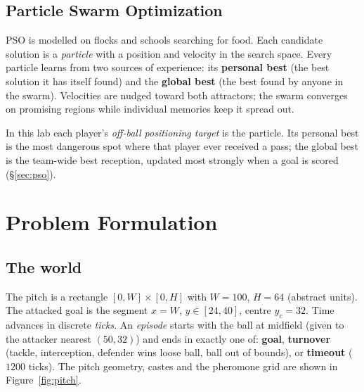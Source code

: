 \documentclass[11pt,a4paper]{article}
\begin{document}
\subsection{Particle Swarm Optimization}

PSO is modelled on flocks and schools searching for food. Each candidate solution is a
\emph{particle} with a position and velocity in the search space. Every particle learns from two
sources of experience: its \textbf{personal best} (the best solution it has itself found) and
the \textbf{global best} (the best found by anyone in the swarm). Velocities are nudged toward
both attractors; the swarm converges on promising regions while individual memories keep it
spread out.

In this lab each player's \emph{off-ball positioning target} is the particle. Its personal best
is the most dangerous spot where that player ever received a pass; the global best is the
team-wide best reception, updated most strongly when a goal is scored (\S\ref{sec:pso}).

\section{Problem Formulation}\label{sec:problem}

\subsection{The world}

The pitch is a rectangle $[0,W]\times[0,H]$ with $W=100$, $H=64$ (abstract units). The attacked
goal is the segment $x=W$, $y\in[24,40]$, centre $y_c=32$. Time advances in discrete
\emph{ticks}. An \emph{episode} starts with the ball at midfield (given to the attacker nearest
$(50,32)$) and ends in exactly one of: \textbf{goal}, \textbf{turnover} (tackle, interception,
defender wins loose ball, ball out of bounds), or \textbf{timeout} ($1200$ ticks). The pitch
geometry, castes and the pheromone grid are shown in Figure~\ref{fig:pitch}.
\end{document}
